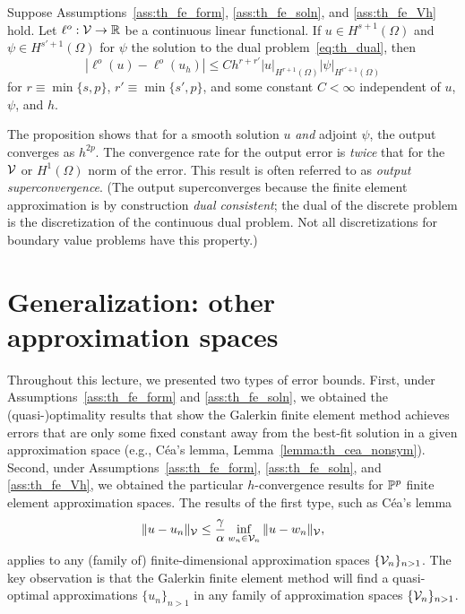 \begin{proposition}
   Suppose Assumptions~\ref{ass:th_fe_form}, \ref{ass:th_fe_soln}, and \ref{ass:th_fe_Vh} hold. Let $\ell^o: \mathcal{V} \to \mathbb{R}$ be a continuous linear functional.  If $u \in H^{s+1}(\Omega)$ and $\psi \in H^{s'+1}(\Omega)$ for $\psi$ the solution to the dual problem~\ref{eq:th_dual}, then
  \begin{equation*}
    | \ell^o(u) - \ell^o(u_h) | \leq C h^{r + r'} | u |_{H^{r+1}(\Omega)} | \psi |_{H^{r'+1}(\Omega)}
  \end{equation*}
  for $r \equiv \min\{ s,p \}$, $r' \equiv \min\{ s',p \}$, and some constant $C < \infty$ independent of $u$, $\psi$, and $h$.
\end{proposition}
The proposition shows that for a smooth solution $u$ \emph{and} adjoint $\psi$, the output converges as $h^{2p}$. The convergence rate for the output error is \emph{twice} that for the $\mathcal{V}$ or $H^1(\Omega)$ norm of the error.  This result is often referred to as \emph{output superconvergence}.  (The output superconverges because the finite element approximation is by construction \emph{dual consistent}; the dual of the discrete problem is the discretization of the continuous dual problem.  Not all discretizations for boundary value problems have this property.)


\section{Generalization: other approximation spaces}
Throughout this lecture, we presented two types of error bounds. First, under Assumptions~\ref{ass:th_fe_form} and \ref{ass:th_fe_soln}, we obtained the (quasi-)optimality results that show the Galerkin finite element method achieves errors that are only some fixed constant away from the best-fit solution in a given approximation space (e.g., C\'ea's lemma, Lemma~\ref{lemma:th_cea_nonsym}).  Second, under Assumptions~\ref{ass:th_fe_form}, \ref{ass:th_fe_soln}, and \ref{ass:th_fe_Vh}, we obtained the particular $h$-convergence results for $\mathbb{P}^p$ finite element approximation spaces. The results of the first type, such as C\'ea's lemma
\begin{equation*}
  \| u - u_n \|_{\mathcal{V}} \leq \frac{\gamma}{\alpha} \inf_{w_n \in \mathcal{V}_n} \| u - w_n \|_{\mathcal{V}},
\end{equation*}
applies to any (family of) finite-dimensional approximation spaces $\{ \mathcal{V}_n \}_{n > 1}$.  The key observation is that the Galerkin finite element method will find a quasi-optimal approximations $\{u_n\}_{n > 1}$ in any family of approximation spaces $\{\mathcal{V}_n \}_{n > 1}$. %

